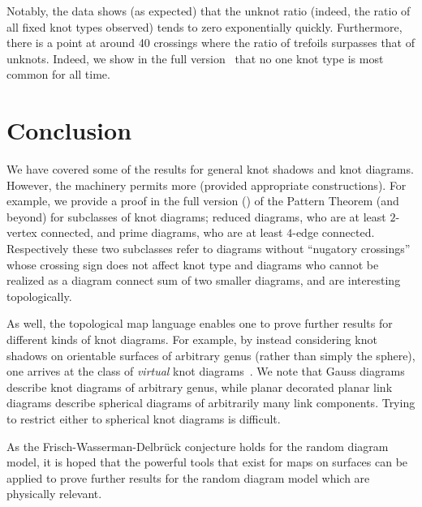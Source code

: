 \documentclass[submission%
]{dmtcs}
\begin{document}
Notably, the data shows (as expected) that the unknot ratio (indeed,
the ratio of all fixed knot types observed) tends to zero
exponentially quickly. Furthermore, there is a point at around 40
crossings where the ratio of trefoils surpasses that of
unknots. Indeed, we show in the full version~\cite{chapman2015} that
no one knot type is most common for all time.

\section{Conclusion}
\label{sec:conclusion}

We have covered some of the results for general knot shadows and knot
diagrams. However, the machinery permits more (provided appropriate
constructions). For example, we provide a proof in the full
version (\cite{chapman2015}) of the Pattern Theorem (and beyond) for
subclasses of knot diagrams; reduced diagrams, who are at least
$2$-vertex connected, and prime diagrams, who are at least $4$-edge
connected. Respectively these two subclasses refer to diagrams without
``nugatory crossings'' whose crossing sign does not affect knot type
and diagrams who cannot be realized as a diagram connect sum of two
smaller diagrams, and are interesting topologically.

As well, the topological map language enables one to prove further
results for different kinds of knot diagrams. For example, by instead
considering knot shadows on orientable surfaces of arbitrary genus
(rather than simply the sphere), one arrives at the class of
\emph{virtual} knot diagrams~\cite{Kauffman1999663}. We note that
Gauss diagrams describe knot diagrams of arbitrary genus, while planar
decorated planar link diagrams describe spherical diagrams of
arbitrarily many link components. Trying to restrict either to
spherical knot diagrams is difficult.

As the Frisch-Wasserman-Delbr\"uck conjecture holds for the random
diagram model, it is hoped that the powerful tools that exist for maps
on surfaces can be applied to prove further results for the random
diagram model which are physically relevant.

\acknowledgements
\label{sec:acknowledgements}
\end{document}
